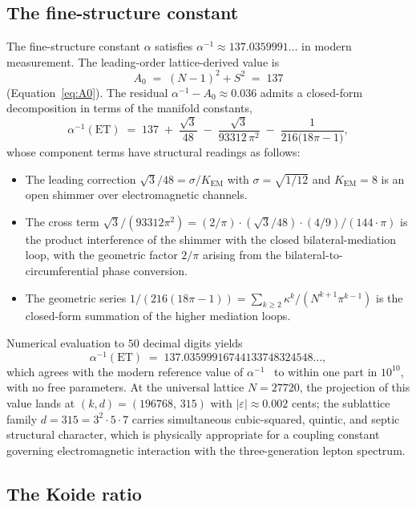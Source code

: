 \documentclass[11pt,a4paper]{article}
\theoremstyle{definition}
\theoremstyle{remark}
\newcommand{\eps}{\varepsilon}
\begin{document}
\subsection{The fine-structure constant}\label{subsec:alpha}

The fine-structure constant $\alpha$ satisfies $\alpha^{-1}\approx 137.0359991\ldots$ in modern measurement. The leading-order lattice-derived value is
\[
A_{0} \;=\; (N-1)^{2}+S^{2} \;=\; 137
\]
(Equation~\ref{eq:A0}). The residual $\alpha^{-1}-A_{0} \approx 0.036$ admits a closed-form decomposition in terms of the manifold constants,
\begin{equation}\label{eq:alpha}
\alpha^{-1}(\mathrm{ET}) \;=\; 137 \;+\; \frac{\sqrt{3}}{48} \;-\; \frac{\sqrt{3}}{93312\,\pi^{2}} \;-\; \frac{1}{216\bigl(18\pi - 1\bigr)},
\end{equation}
whose component terms have structural readings as follows:
\begin{itemize}[leftmargin=*]
\item The leading correction $\sqrt{3}/48 = \sigma/K_{\mathrm{EM}}$ with $\sigma = \sqrt{1/12}$ and $K_{\mathrm{EM}} = 8$ is an open shimmer over electromagnetic channels.
\item The cross term $\sqrt{3}/(93312\pi^{2}) = (2/\pi)\cdot(\sqrt{3}/48)\cdot(4/9)/(144\cdot\pi)$ is the product interference of the shimmer with the closed bilateral-mediation loop, with the geometric factor $2/\pi$ arising from the bilateral-to-circumferential phase conversion.
\item The geometric series $1/(216(18\pi-1)) = \sum_{k\ge 2}\kappa^{k}/(N^{k+1}\pi^{k-1})$ is the closed-form summation of the higher mediation loops.
\end{itemize}

Numerical evaluation to $50$ decimal digits yields
\[
\alpha^{-1}(\mathrm{ET}) \;=\; 137.03599916744133748324548\ldots,
\]
which agrees with the modern reference value of $\alpha^{-1}$~\cite{LatComp2025} to within one part in $10^{10}$, with no free parameters. At the universal lattice $N=27720$, the projection of this value lands at $(k,d)=(196768,\,315)$ with $|\eps|\approx 0.002$ cents; the sublattice family $d=315 = 3^{2}\cdot 5\cdot 7$ carries simultaneous cubic-squared, quintic, and septic structural character, which is physically appropriate for a coupling constant governing electromagnetic interaction with the three-generation lepton spectrum.

\subsection{The Koide ratio}\label{subsec:koide}
\end{document}
